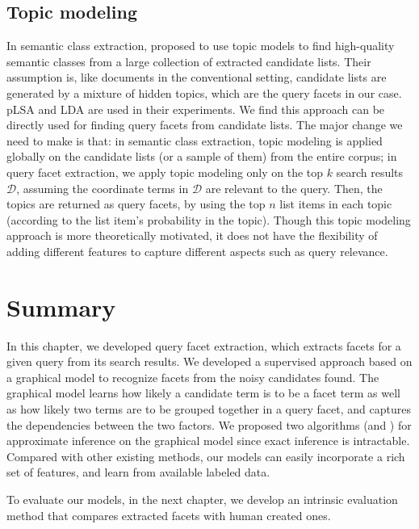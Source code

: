 \subsection{Topic modeling}
In semantic class extraction, \citet{zhang2009employing} proposed to use topic models 
to find high-quality semantic classes from a large collection of extracted candidate lists.
Their assumption is, like documents in the conventional setting, candidate lists are generated by a mixture of hidden topics, which are the query facets in our case. pLSA and LDA are used in their experiments.
We find this approach can be directly used for finding query facets from candidate lists.
The major change we need to make is that: in semantic class extraction, topic modeling is applied globally on the candidate lists (or a sample of them) from the entire corpus; in query facet extraction, we apply topic modeling only on the top $k$ search results $\mathcal{D}$, assuming the coordinate terms in $\mathcal{D}$ are relevant to the query.
Then, the topics are returned as query facets, by using the top $n$ list items in each topic (according to the list item's probability in the topic).
Though this topic modeling approach is more theoretically motivated, it does not have the flexibility of adding different features to capture different aspects such as query relevance.

\section{Summary}
In this chapter, we developed query facet extraction, which extracts facets for a given query from its search results. We developed a supervised approach based on a graphical model to recognize facets from the noisy candidates found. The graphical model learns how likely a candidate term is to be a facet term as well as how likely two terms are to be grouped together in a query facet, and captures the dependencies between the two factors. We proposed two algorithms (\QFI and \QFJ) for approximate inference on the graphical model since exact inference is intractable. Compared with other existing methods, our models can easily incorporate a rich set of features, and learn from available labeled data.

To evaluate our models, in the next chapter, we develop an intrinsic evaluation method that compares extracted facets with human created ones.
